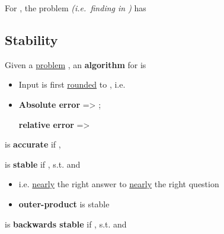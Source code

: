 For , the problem
 \emph{(i.e.~finding
       in )} has


\subsection*{Stability}

Given a \underline{problem} , an \textbf{algorithm} for
 is 

\begin{itemize}
      \item
            Input  is first \underline{rounded} to ,
            i.e. 
      \item
            \textbf{Absolute error} => ;

            \textbf{relative error} => 
\end{itemize}

 is \textbf{accurate} if ,

 is \textbf{stable} if ,
 s.t.
and

\begin{itemize}

      \item
            i.e. \underline{nearly} the right answer to \underline{nearly} the right question
      \item
            \textbf{outer-product} is stable
\end{itemize}

 is \textbf{backwards stable} if
,  s.t.
 and

